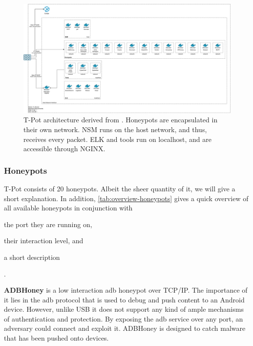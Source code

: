 \begin{figure}
    \centering
    \includegraphics[width=\textwidth]{figures/tpot-architecture.pdf}
    \caption[T-Pot architecture]{
        T-Pot architecture derived from \cite{tpot2021}.
        Honeypots are encapsulated in their own network.
        NSM runs on the host network, and thus, receives every packet.
        ELK and tools run on localhost, and are accessible through NGINX.
    }
    \label{fig:overview-tpot}
\end{figure}

\subsubsection{Honeypots}

T-Pot consists of 20 honeypots. Albeit the sheer quantity of it, we will give a short explanation.
In addition, \autoref{tab:overview-honeypots} gives a quick overview of all available honeypots in conjunction with
\begin{enumerate*}[label=(\roman*)]
    \item the port they are running on,
    \item their interaction level, and
    \item a short description
\end{enumerate*}.

\textbf{ADBHoney} \cite{adbhoney2021} is a low interaction \ac{adb} honeypot over TCP/IP.
The importance of it lies in the \ac{adb} protocol that is used to debug and push content to an Android device.
However, unlike USB it does not support any kind of ample mechanisms of authentication and protection.
By exposing the \ac{adb} service over any port, an adversary could connect and exploit it.
ADBHoney is designed to catch malware that has been pushed onto devices.

